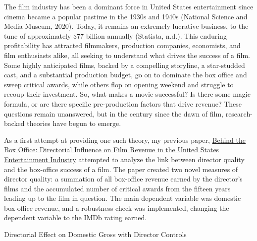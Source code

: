 \documentclass[
]{agujournal2019}
\begin{document}
The film industry has been a dominant force in United States
entertainment since cinema became a popular pastime in the 1930s and
1940s (National Science and Media Museum, 2020). Today, it remains an
extremely lucrative business, to the tune of approximately \$77 billion
annually (Statista, n.d.). This enduring profitability has attracted
filmmakers, production companies, economists, and film enthusiasts
alike, all seeking to understand what drives the success of a film. Some
highly anticipated films, backed by a compelling storyline, a
star-studded cast, and a substantial production budget, go on to
dominate the box office and sweep critical awards, while others flop on
opening weekend and struggle to recoup their investment. So, what makes
a movie successful? Is there some magic formula, or are there specific
pre-production factors that drive revenue? These questions remain
unanswered, but in the century since the dawn of film, research-backed
theories have begun to emerge.

As a first attempt at providing one such theory, my previous paper,
\href{./assets/thesis.pdf}{Behind the Box Office: Directorial Influence
on Film Revenue in the United States Entertainment Industry} attempted
to analyze the link between director quality and the box-office success
of a film. The paper created two novel measures of director quality: a
summation of all box-office revenue earned by the director's films and
the accumulated number of critical awards from the fifteen years leading
up to the film in question. The main dependent variable was domestic
box-office revenue, and a robustness check was implemented, changing the
dependent variable to the IMDb rating earned.

\begin{table}

\caption{\label{tbl-1}Directorial Effect on Domestic Gross with Director
Controls}


\end{table}%
\end{document}

